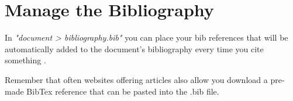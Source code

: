 \section{Manage the Bibliography}
In \textit{"document > bibliography.bib"} you can place your bib references that will be automatically added to the document's bibliography every time you cite something \cite{https://doi.org/10.1002/job.4030130102}.

Remember that often websites offering articles also allow you download a pre-made BibTex reference that can be pasted into the .bib file.
